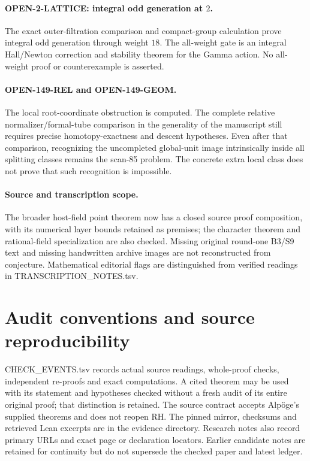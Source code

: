 \documentclass[11pt,a4paper]{article}
\theoremstyle{definition}
\begin{document}
\paragraph{OPEN-2-LATTICE: integral odd generation at $2$.}
The exact outer-filtration comparison and compact-group calculation
prove integral odd generation through weight $18$. The all-weight gate
is an integral Hall/Newton correction and stability theorem for the
Gamma action. No all-weight proof or counterexample is asserted.

\paragraph{OPEN-149-REL and OPEN-149-GEOM.}
The local root-coordinate obstruction is computed. The complete
relative normalizer/formal-tube comparison in the generality of the
manuscript still requires precise homotopy-exactness and descent
hypotheses. Even after that comparison, recognizing the uncompleted
global-unit image intrinsically inside all splitting classes remains
the scan-85 problem. The concrete extra local class does not prove
that such recognition is impossible.

\paragraph{Source and transcription scope.}
The broader host-field point theorem now has a closed source proof
composition, with its numerical layer bounds retained as premises;
the character theorem and rational-field specialization are also checked. Missing original
round-one B3/S9 text and missing handwritten archive images are not
reconstructed from conjecture. Mathematical editorial flags are
distinguished from verified readings in TRANSCRIPTION\_NOTES.tsv.

\section{Audit conventions and source reproducibility}
CHECK\_EVENTS.tsv records actual source readings, whole-proof checks,
independent re-proofs and exact computations. A cited theorem may be
used with its statement and hypotheses checked without a fresh audit of
its entire original proof; that distinction is retained. The source
contract accepts Alp\"oge's supplied theorems and does not reopen RH.
The pinned mirror, checksums and retrieved Lean excerpts are in the
evidence directory. Research notes also record primary URLs and exact
page or declaration locators. Earlier candidate notes are retained for
continuity but do not supersede the checked paper and latest ledger.
\end{document}
